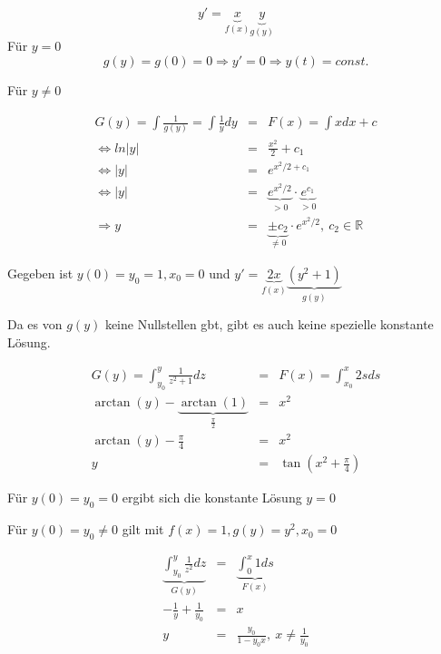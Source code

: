 \documentclass[10pt,a4paper]{article}
\begin{document}
\begin{bsp}[$y'=xy$]
\begin{equation*}y'=\underbrace{x}_{f(x)} \underbrace{y}_{g(y)}\end{equation*}
Für $y=0$ 
\begin{equation*}g(y)=g(0)=0 \Rightarrow y'=0 \Rightarrow y(t)=const. \end{equation*}

\noindent Für $y \not= 0 $

\begin{eqnarray*}
G(y)=\int \frac{1}{g(y)} = \int \frac{1}{y} dy &=& F(x) = \int x dx +c \\
\Leftrightarrow ln \left| y \right| &=& \frac{x^{2}}{2} +c_1 \\
\Leftrightarrow \left| y \right| &=& e^{x^{2}/2 + c_1} \\
\Leftrightarrow \left| y \right| &=& \underbrace{e^{x^{2}/2}}_{>0} \cdot \underbrace{e^{c_1}}_{ > 0} \\
\Rightarrow y &=& \underbrace{\pm c_2}_{\not= 0} \cdot e^{x^{2}/2}, ~ c_2 \in \mathbb{R}
\end{eqnarray*}
\end{bsp}

\begin{bsp}[$y'=2xy^{2}+2x$]

Gegeben ist $y(0)=y_0=1, x_0=0$ und $y'=\underbrace{2x}_{f(x)}\underbrace{(y^{2}+1)}_{g(y)}$

Da es von $g(y)$ keine Nullstellen gbt, gibt es auch keine spezielle konstante Lösung.

\begin{eqnarray*}
G(y)= \int^{y}_{y_0} \frac{1}{z^{2}+1}dz &=& F(x) = \int^{x}_{x_0} 2s ds \\
\arctan(y)-\underbrace{\arctan(1)}_\frac{\pi}{2} &=& x^{2} \\
\arctan (y) - \frac{\pi}{4} &=& x^{2} \\
y &=& \tan(x^{2}+\frac{\pi}{4})
\end{eqnarray*}


\end{bsp}

\begin{bsp}[$y'=y^{2}$]

Für $y(0)=y_0 = 0$ ergibt sich die konstante Lösung $y=0$

\noindent Für $y(0)=y_0 \not= 0$ gilt mit $f(x)=1, g(y)=y^{2},x_0=0$

\begin{eqnarray*}
\underbrace{\int^{y}_{y_0} \frac{1}{z^{2}}dz}_{G(y)} &=& \underbrace{\int^{x}_{0}1ds}_{F(x)} \\
- \frac{1}{y} + \frac{1}{y_0} &=&x \\
y &=& \frac{y_0}{1-y_0x}, ~ x \not= \frac{1}{y_0}
\end{eqnarray*}


\end{bsp}
\end{document}
